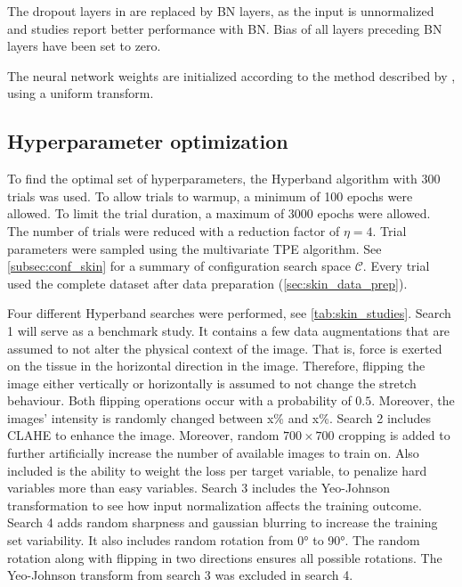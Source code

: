 The dropout layers in \cite{Soylu2022} are replaced by BN layers, as the input is unnormalized and studies report better performance with BN.
Bias of all layers preceding BN layers have been set to zero.

The neural network weights are initialized according to the method described by \textcite{He2015a}, using a uniform transform.

\subsection{Hyperparameter optimization}
To find the optimal set of hyperparameters, the Hyperband algorithm with 300 trials was used.
To allow trials to warmup, a minimum of 100 epochs were allowed.
To limit the trial duration, a maximum of 3000 epochs were allowed.
The number of trials were reduced with a reduction factor of $\eta=4$.
Trial parameters were sampled using the multivariate TPE algorithm.
See \cref{subsec:conf_skin} for a summary of configuration search space $\mathcal{C}$.
Every trial used the complete dataset after data preparation (\cref{sec:skin_data_prep}).

Four different Hyperband searches were performed, see \cref{tab:skin_studies}.
Search 1 will serve as a benchmark study.
It contains a few data augmentations that are assumed to not alter the physical context of the image.
That is, force is exerted on the tissue in the horizontal direction in the image.
Therefore, flipping the image either vertically or horizontally is assumed to not change the stretch behaviour.
Both flipping operations occur with a probability of $0.5$.
Moreover, the images' intensity is randomly changed between x\% and x\%.
Search 2 includes CLAHE to enhance the image.
Moreover, random $700\times700$ cropping is added to further artificially increase the number of available images to train on.
Also included is the ability to weight the loss per target variable, to penalize hard variables more than easy variables.
Search 3 includes the Yeo-Johnson transformation to see how input normalization affects the training outcome.
Search 4 adds random sharpness and gaussian blurring to increase the training set variability.
It also includes random rotation from \ang{0} to \ang{90}.
The random rotation along with flipping in two directions ensures all possible rotations.
The Yeo-Johnson transform from search 3 was excluded in search 4.


